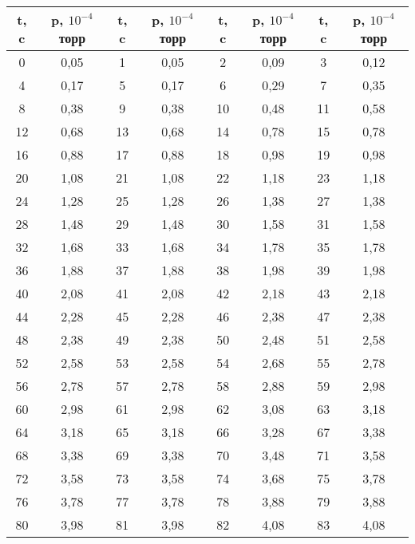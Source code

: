 \begin{table}[h]
\centering
\begin{tabular}[h]{|c|c|c|c|c|c|c|c|}
        \hline
        t, c & p,  $10^{-4}$ торр & t, c & p,  $10^{-4}$ торр & t, c & p,  $10^{-4}$ торр & t, c & p,  $10^{-4}$ торр \\
        \hline
                0 & 0,05 & 1 & 0,05 & 2 & 0,09 & 3 & 0,12\\
        \hline
        4 & 0,17 & 5 & 0,17 & 6 & 0,29 & 7 & 0,35\\
        \hline
        8 & 0,38 & 9 & 0,38 & 10 & 0,48 & 11 & 0,58\\
        \hline
        12 & 0,68 & 13 & 0,68 & 14 & 0,78 & 15 & 0,78\\
        \hline
        16 & 0,88 & 17 & 0,88 & 18 & 0,98 & 19 & 0,98\\
        \hline
        20 & 1,08 & 21 & 1,08 & 22 & 1,18 & 23 & 1,18\\
        \hline
        24 & 1,28 & 25 & 1,28 & 26 & 1,38 & 27 & 1,38\\
        \hline
        28 & 1,48 & 29 & 1,48 & 30 & 1,58 & 31 & 1,58\\
        \hline
        32 & 1,68 & 33 & 1,68 & 34 & 1,78 & 35 & 1,78\\
        \hline
        36 & 1,88 & 37 & 1,88 & 38 & 1,98 & 39 & 1,98\\
        \hline
        40 & 2,08 & 41 & 2,08 & 42 & 2,18 & 43 & 2,18\\
        \hline
        44 & 2,28 & 45 & 2,28 & 46 & 2,38 & 47 & 2,38\\
        \hline
        48 & 2,38 & 49 & 2,38 & 50 & 2,48 & 51 & 2,58\\
        \hline
        52 & 2,58 & 53 & 2,58 & 54 & 2,68 & 55 & 2,78\\
        \hline
        56 & 2,78 & 57 & 2,78 & 58 & 2,88 & 59 & 2,98\\
        \hline
        60 & 2,98 & 61 & 2,98 & 62 & 3,08 & 63 & 3,18\\
        \hline
        64 & 3,18 & 65 & 3,18 & 66 & 3,28 & 67 & 3,38\\
        \hline
        68 & 3,38 & 69 & 3,38 & 70 & 3,48 & 71 & 3,58\\
        \hline
        72 & 3,58 & 73 & 3,58 & 74 & 3,68 & 75 & 3,78\\
        \hline
        76 & 3,78 & 77 & 3,78 & 78 & 3,88 & 79 & 3,88\\
        \hline
        80 & 3,98 & 81 & 3,98 & 82 & 4,08 & 83 & 4,08\\

\end{tabular}
\end{table}
